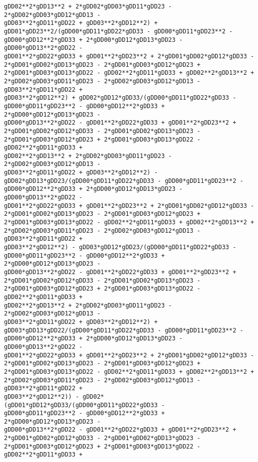 \documentclass[landscape,letterpaper,10pt,english]{article}
\begin{document}
\begin{Verbatim}[commandchars=\\\{\}]
gDD02**2*gDD13**2 + 2*gDD02*gDD03*gDD11*gDD23 - 2*gDD02*gDD03*gDD12*gDD13 -
gDD03**2*gDD11*gDD22 + gDD03**2*gDD12**2) +
gDD01*gDD23**2/(gDD00*gDD11*gDD22*gDD33 - gDD00*gDD11*gDD23**2 -
gDD00*gDD12**2*gDD33 + 2*gDD00*gDD12*gDD13*gDD23 - gDD00*gDD13**2*gDD22 -
gDD01**2*gDD22*gDD33 + gDD01**2*gDD23**2 + 2*gDD01*gDD02*gDD12*gDD33 -
2*gDD01*gDD02*gDD13*gDD23 - 2*gDD01*gDD03*gDD12*gDD23 +
2*gDD01*gDD03*gDD13*gDD22 - gDD02**2*gDD11*gDD33 + gDD02**2*gDD13**2 +
2*gDD02*gDD03*gDD11*gDD23 - 2*gDD02*gDD03*gDD12*gDD13 - gDD03**2*gDD11*gDD22 +
gDD03**2*gDD12**2) + gDD02*gDD12*gDD33/(gDD00*gDD11*gDD22*gDD33 -
gDD00*gDD11*gDD23**2 - gDD00*gDD12**2*gDD33 + 2*gDD00*gDD12*gDD13*gDD23 -
gDD00*gDD13**2*gDD22 - gDD01**2*gDD22*gDD33 + gDD01**2*gDD23**2 +
2*gDD01*gDD02*gDD12*gDD33 - 2*gDD01*gDD02*gDD13*gDD23 -
2*gDD01*gDD03*gDD12*gDD23 + 2*gDD01*gDD03*gDD13*gDD22 - gDD02**2*gDD11*gDD33 +
gDD02**2*gDD13**2 + 2*gDD02*gDD03*gDD11*gDD23 - 2*gDD02*gDD03*gDD12*gDD13 -
gDD03**2*gDD11*gDD22 + gDD03**2*gDD12**2) -
gDD02*gDD13*gDD23/(gDD00*gDD11*gDD22*gDD33 - gDD00*gDD11*gDD23**2 -
gDD00*gDD12**2*gDD33 + 2*gDD00*gDD12*gDD13*gDD23 - gDD00*gDD13**2*gDD22 -
gDD01**2*gDD22*gDD33 + gDD01**2*gDD23**2 + 2*gDD01*gDD02*gDD12*gDD33 -
2*gDD01*gDD02*gDD13*gDD23 - 2*gDD01*gDD03*gDD12*gDD23 +
2*gDD01*gDD03*gDD13*gDD22 - gDD02**2*gDD11*gDD33 + gDD02**2*gDD13**2 +
2*gDD02*gDD03*gDD11*gDD23 - 2*gDD02*gDD03*gDD12*gDD13 - gDD03**2*gDD11*gDD22 +
gDD03**2*gDD12**2) - gDD03*gDD12*gDD23/(gDD00*gDD11*gDD22*gDD33 -
gDD00*gDD11*gDD23**2 - gDD00*gDD12**2*gDD33 + 2*gDD00*gDD12*gDD13*gDD23 -
gDD00*gDD13**2*gDD22 - gDD01**2*gDD22*gDD33 + gDD01**2*gDD23**2 +
2*gDD01*gDD02*gDD12*gDD33 - 2*gDD01*gDD02*gDD13*gDD23 -
2*gDD01*gDD03*gDD12*gDD23 + 2*gDD01*gDD03*gDD13*gDD22 - gDD02**2*gDD11*gDD33 +
gDD02**2*gDD13**2 + 2*gDD02*gDD03*gDD11*gDD23 - 2*gDD02*gDD03*gDD12*gDD13 -
gDD03**2*gDD11*gDD22 + gDD03**2*gDD12**2) +
gDD03*gDD13*gDD22/(gDD00*gDD11*gDD22*gDD33 - gDD00*gDD11*gDD23**2 -
gDD00*gDD12**2*gDD33 + 2*gDD00*gDD12*gDD13*gDD23 - gDD00*gDD13**2*gDD22 -
gDD01**2*gDD22*gDD33 + gDD01**2*gDD23**2 + 2*gDD01*gDD02*gDD12*gDD33 -
2*gDD01*gDD02*gDD13*gDD23 - 2*gDD01*gDD03*gDD12*gDD23 +
2*gDD01*gDD03*gDD13*gDD22 - gDD02**2*gDD11*gDD33 + gDD02**2*gDD13**2 +
2*gDD02*gDD03*gDD11*gDD23 - 2*gDD02*gDD03*gDD12*gDD13 - gDD03**2*gDD11*gDD22 +
gDD03**2*gDD12**2)) - gDD02*(gDD01*gDD12*gDD33/(gDD00*gDD11*gDD22*gDD33 -
gDD00*gDD11*gDD23**2 - gDD00*gDD12**2*gDD33 + 2*gDD00*gDD12*gDD13*gDD23 -
gDD00*gDD13**2*gDD22 - gDD01**2*gDD22*gDD33 + gDD01**2*gDD23**2 +
2*gDD01*gDD02*gDD12*gDD33 - 2*gDD01*gDD02*gDD13*gDD23 -
2*gDD01*gDD03*gDD12*gDD23 + 2*gDD01*gDD03*gDD13*gDD22 - gDD02**2*gDD11*gDD33 +

\end{Verbatim}
\end{document}
